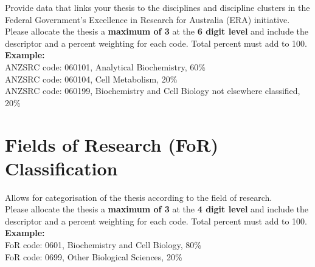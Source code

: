 \begin{instructional}
    Provide data that links your thesis to the disciplines and discipline clusters in the Federal Government’s Excellence in Research for Australia (ERA) initiative.\\
    
    \noindent
    Please allocate the thesis a \textbf{maximum of 3} \href{http://www.abs.gov.au/Ausstats/abs@.nsf/Latestproducts/6BB427AB9696C225CA2574180004463E?opendocument}{\color{blue}{Australian and New Zealand Standard Research Classifications (ANZSRC) codes}} at the \textbf{6 digit level} and include the descriptor and a percent weighting for each code. Total percent must add to 100.\\


\textbf{Example:}\\


    ANZSRC code: 060101, Analytical Biochemistry, 60\% \\
    \indent ANZSRC code: 060104, Cell Metabolism, 20\% \\
    \indent ANZSRC code: 060199, Biochemistry and Cell Biology not elsewhere classified, 20\%
\end{instructional}





\section*{Fields of Research (FoR) Classification}

\begin{instructional}
    Allows for categorisation of the thesis according to the field of research. \\
    
    \noindent
    Please allocate the thesis a \textbf{maximum of 3} \href{http://www.abs.gov.au/Ausstats/abs@.nsf/Latestproducts/6BB427AB9696C225CA2574180004463E?opendocument}{\color{blue}{Fields of Research (FoR) Codes}} at the \textbf{4 digit level} and include the descriptor and a percent weighting for each code. Total percent must add to 100. \\

\textbf{Example:}\\

FoR code: 0601, Biochemistry and Cell Biology, 80\% \\
\indent FoR code: 0699, Other Biological Sciences, 20\%
\end{instructional}


